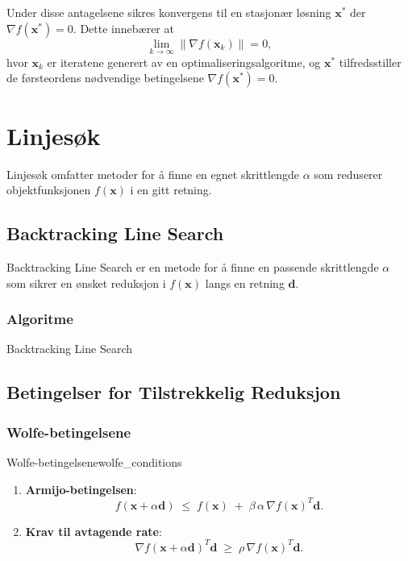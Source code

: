 Under disse antagelsene sikres konvergens til en stasjonær løsning \(\symbf{x}^*\) der 
\(\nabla f(\symbf{x}^*) = 0\). 
Dette innebærer at
\[
  \lim_{k \to \infty} \|\nabla f(\symbf{x}_k)\| = 0,
\]
hvor \(\symbf{x}_k\) er iteratene generert av en optimaliseringsalgoritme, og \(\symbf{x}^*\) tilfredsstiller de førsteordens nødvendige betingelsene \(\nabla f(\symbf{x}^*) = 0\).

\section{Linjesøk}

Linjesøk omfatter metoder for å finne en egnet skrittlengde \(\alpha\) som reduserer objektfunksjonen \(f(\symbf{x})\) i en gitt retning.

\subsection{Backtracking Line Search}
Backtracking Line Search er en metode for å finne en passende skrittlengde \(\alpha\) som sikrer en ønsket reduksjon i \(f(\symbf{x})\) langs en retning \(\symbf{d}\).

\subsubsection{Algoritme}
\begin{algorithm}[H]
  \SetAlgoLined
  \caption{Backtracking Line Search}
\end{algorithm}

\subsection{Betingelser for Tilstrekkelig Reduksjon}

\subsubsection{Wolfe-betingelsene}
\begin{definition}{Wolfe-betingelsene}{wolfe_conditions}
  \begin{enumerate}
    \item \textbf{Armijo-betingelsen}:
          \[
            f(\symbf{x} + \alpha \symbf{d}) 
            \;\le\; 
            f(\symbf{x}) 
            \;+\; 
            \beta\,\alpha\,\nabla f(\symbf{x})^T \symbf{d}.
          \]
    \item \textbf{Krav til avtagende rate}:
          \[
            \nabla f(\symbf{x} + \alpha \symbf{d})^T \symbf{d} 
            \;\ge\; 
            \rho \,\nabla f(\symbf{x})^T \symbf{d}.
          \]
  \end{enumerate}
\end{definition}

